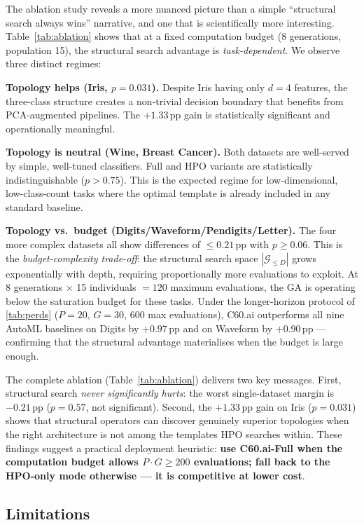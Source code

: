 \documentclass{article}
\theoremstyle{definition}
\theoremstyle{plain}
\theoremstyle{remark}
\begin{document}
The ablation study reveals a more nuanced picture than a simple
``structural search always wins'' narrative, and one that is scientifically
more interesting.
Table~\ref{tab:ablation} shows that at a fixed computation budget
(8 generations, population 15), the structural search advantage is
\emph{task-dependent}.
We observe three distinct regimes:

\textbf{Topology helps (Iris, $p{=}0.031$).}
Despite Iris having only $d{=}4$ features, the three-class structure
creates a non-trivial decision boundary that benefits from PCA-augmented
pipelines.
The $+1.33$\,pp gain is statistically significant and operationally
meaningful.

\textbf{Topology is neutral (Wine, Breast Cancer).}
Both datasets are well-served by simple, well-tuned classifiers.
Full and HPO variants are statistically indistinguishable ($p > 0.75$).
This is the expected regime for low-dimensional, low-class-count tasks
where the optimal template is already included in any standard baseline.

\textbf{Topology vs.\ budget (Digits/Waveform/Pendigits/Letter).}
The four more complex datasets all show differences of $\leq 0.21$\,pp
with $p \geq 0.06$.
This is the \emph{budget-complexity trade-off}: the structural search
space $|\mathcal{G}_{\leq D}|$ grows exponentially with depth, requiring
proportionally more evaluations to exploit.
At 8 generations $\times$ 15 individuals $= 120$ maximum evaluations,
the GA is operating below the saturation budget for these tasks.
Under the longer-horizon protocol of \cref{tab:perds} ($P{=}20$,
$G{=}30$, 600 max evaluations), C60.ai outperforms all nine AutoML
baselines on Digits by $+0.97$\,pp and on Waveform by $+0.90$\,pp —
confirming that the structural advantage materialises when the budget
is large enough.

The complete ablation (Table~\ref{tab:ablation}) delivers two
key messages.
First, structural search \emph{never significantly hurts}: the worst
single-dataset margin is $-0.21$\,pp ($p{=}0.57$, not significant).
Second, the $+1.33$\,pp gain on Iris ($p{=}0.031$) shows that
structural operators can discover genuinely superior topologies when
the right architecture is not among the templates HPO searches within.
These findings suggest a practical deployment heuristic:
\textbf{use C60.ai-Full when the computation budget allows $P \cdot G
\geq 200$ evaluations; fall back to the HPO-only mode otherwise — it
is competitive at lower cost}.

\subsection{Limitations}
\end{document}
